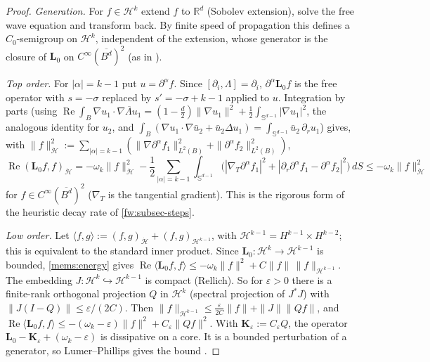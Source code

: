 \begin{proof}
\emph{Generation.} For $f\in\mathcal H^k$ extend $f$ to $\mathbb R^d$ (Sobolev
extension), solve the free wave equation and transform back. By finite speed
of propagation this defines a $C_0$-semigroup on $\mathcal H^k$, independent of
the extension, whose generator is the closure of $\mathbf L_0$ on
$C^\infty(\overline{B^d})^2$ (as in
\cite{DonningerSchoerkhuber2017,Ostermann2024}).

\emph{Top order.} For $|\alpha|=k-1$ put $u=\partial^\alpha f$. Since
$[\partial_i,\Lambda]=\partial_i$, $\partial^\alpha\mathbf L_0f$ is the free operator
with $s=-\sigma$ replaced by $s'=-\sigma+k-1$ applied to $u$. Integration by
parts (using $\operatorname{Re}\int_B\nabla u_1\cdot\overline{\nabla\Lambda u_1}=(1-\frac d2)\|\nabla
u_1\|^2+\frac12\int_{\mathbb S^{d-1}}|\nabla u_1|^2$, the analogous identity for
$u_2$, and $\int_B(\nabla u_1\cdot\nabla\bar u_2+\bar u_2\Delta u_1)=\int_{\mathbb S^{d-1}}\bar u_2\,\partial_ru_1$) gives, with $\|f\|_{\dot{\mathcal H}}^2:=\sum_{|\alpha|=k-1}(\|\nabla\partial^\alpha f_1\|^2_{L^2(B)}+\|\partial^\alpha f_2\|^2_{L^2(B)})$,
\begin{equation}\label{mems:energy}
\operatorname{Re}(\mathbf L_0f,f)_{\dot{\mathcal H}}
=-\omega_k\|f\|_{\dot{\mathcal H}}^2-\frac12\sum_{|\alpha|=k-1}\int_{\mathbb S^{d-1}}
\big(|\nabla_{\!T}\partial^\alpha f_1|^2+|\partial_r\partial^\alpha f_1-\partial^\alpha f_2|^2\big)\,dS
\le-\omega_k\|f\|^2_{\dot{\mathcal H}}
\end{equation}
for $f\in C^\infty(\overline{B^d})^2$ ($\nabla_T$ is the tangential gradient). This
is the rigorous form of the heuristic decay rate of \cref{fw:subsec-steps}.

\emph{Low order.} Let $\langle f,g\rangle:=(f,g)_{\dot{\mathcal H}}+(f,g)_{\mathcal
H^{k-1}}$, with $\mathcal H^{k-1}=H^{k-1}\times H^{k-2}$; this is equivalent to
the standard inner product. Since $\mathbf L_0:\mathcal H^k\to\mathcal H^{k-1}$ is
bounded, \eqref{mems:energy} gives
$\operatorname{Re}\langle\mathbf L_0f,f\rangle\le-\omega_k\|f\|^2+C\|f\|\,\|f\|_{\mathcal H^{k-1}}$.
The embedding $J:\mathcal H^k\hookrightarrow\mathcal H^{k-1}$ is compact (Rellich).
So for $\varepsilon>0$ there is a finite-rank orthogonal projection $Q$ in
$\mathcal H^k$ (spectral projection of $J^*J$) with $\|J(I-Q)\|\le\varepsilon/(2C)$.
Then $\|f\|_{\mathcal H^{k-1}}\le\frac{\varepsilon}{2C}\|f\|+\|J\|\|Qf\|$, and
$\operatorname{Re}\langle\mathbf L_0f,f\rangle\le-(\omega_k-\varepsilon)\|f\|^2+C_\varepsilon\|Qf\|^2$.
With $\mathbf K_\varepsilon:=C_\varepsilon Q$, the operator $\mathbf L_0-\mathbf K_\varepsilon+(\omega_k-\varepsilon)$
is dissipative on a core. It is a bounded perturbation of a generator, so
Lumer--Phillips gives the bound \cite[Ch.~II--III]{EngelNagel2000}.
\end{proof}

